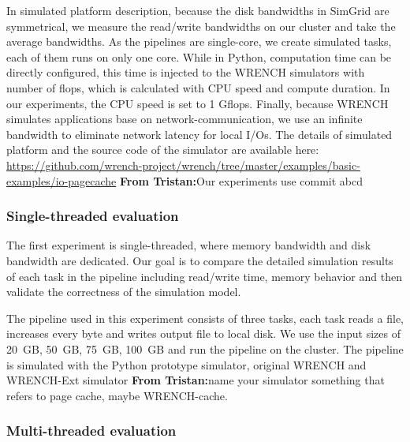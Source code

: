 \documentclass[conference]{IEEEtran}
\newcommand{\tristan}[1]{\color{orange}\textbf{From Tristan:}#1\color{black}}
\begin{document}
            In simulated platform description, because the disk bandwidths in SimGrid 
            are symmetrical, we measure the read/write bandwidths on our cluster and 
            take the average bandwidths. 
            As the pipelines are single-core, we create simulated tasks, 
            each of them runs on only one core. 
            While in Python, computation time can be directly configured, 
            this time is injected to the WRENCH simulators with number of flops, 
            which is calculated with CPU speed and compute duration. 
            In our experiments, the CPU speed is set to 1 Gflops. 
            Finally, because WRENCH simulates applications base on network-communication, 
            we use an infinite bandwidth to eliminate network latency for local I/Os.
            The details of simulated platform and the source code of the simulator 
            are available here: 
            \url{https://github.com/wrench-project/wrench/tree/master/examples/basic-examples/io-pagecache}
            \tristan{Our experiments use commit abcd}
            
            \subsubsection{Single-threaded evaluation}
            
            The first experiment is single-threaded, where memory bandwidth 
            and disk bandwidth are dedicated. 
            Our goal is to compare the detailed simulation results of each task 
            in the pipeline including read/write time, memory behavior and 
            then validate the correctness of the simulation model. 

            The pipeline used in this experiment consists of three tasks, 
            each task reads a file, increases every byte and writes output file 
            to local disk. 
            We use the input sizes of 20~GB, 50~GB, 75~GB, 100~GB and run 
            the pipeline on the cluster.
            The pipeline is simulated with the Python prototype simulator, 
            original WRENCH and WRENCH-Ext simulator \tristan{name your simulator something 
            that refers to page cache, maybe WRENCH-cache}. 
            
            \subsubsection{Multi-threaded evaluation}
\end{document}
